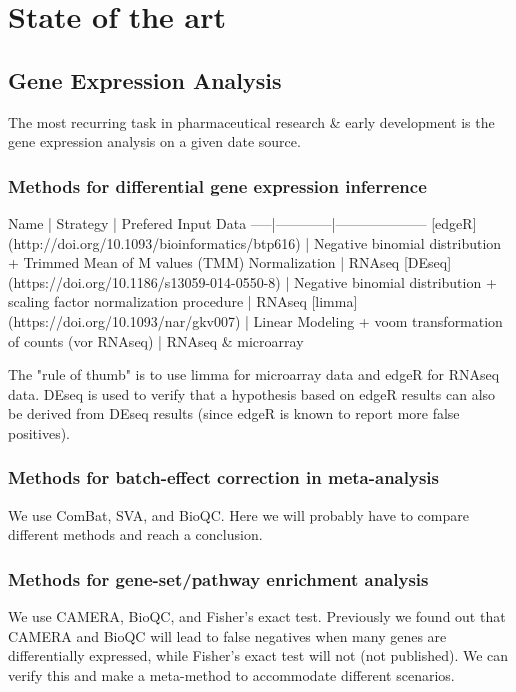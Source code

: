 
\chapter{State of the art}
\label{ch:sota}

\section{Gene Expression Analysis}

The most recurring task in pharmaceutical research \& early development is the gene expression analysis on a given date source. 

\subsection{Methods for differential gene expression inferrence}

Name | Strategy | Prefered Input Data
-----|------------|--------------------
[edgeR](http://doi.org/10.1093/bioinformatics/btp616) | Negative binomial distribution + Trimmed Mean of M values (TMM) Normalization | RNAseq
[DEseq](https://doi.org/10.1186/s13059-014-0550-8) | Negative binomial distribution + scaling factor normalization procedure | RNAseq
[limma](https://doi.org/10.1093/nar/gkv007) | Linear Modeling + voom transformation of counts (vor RNAseq) | RNAseq \& microarray

The "rule of thumb" is to use limma for microarray data and edgeR for RNAseq data. DEseq is used to verify that a hypothesis based on edgeR results can also be derived from DEseq results (since edgeR is known to report more false positives).

\subsection{Methods for batch-effect correction in meta-analysis}

We use ComBat, SVA, and BioQC. Here we will probably have to compare different methods and reach a conclusion.

\subsection{Methods for gene-set/pathway enrichment analysis}

We use CAMERA, BioQC, and Fisher's exact test.
Previously we found out that CAMERA and BioQC will lead to false negatives when many genes are differentially expressed, while Fisher's exact test will not (not published). We can verify this and make a meta-method to accommodate different scenarios.

